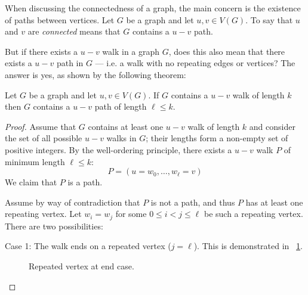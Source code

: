 When discussing the connectedness of a graph, the main concern is the existence of paths between vertices.  Let
\(G\) be a graph and let \(u,v\in V(G)\).  To say that \(u\) and \(v\) are \emph{connected} means that \(G\)
contains a \(u-v\) path.

But if there exists a \(u-v\) walk in a graph \(G\), does this also mean that there exists a \(u-v\) path in \(G\)
--- i.e. a walk with no repeating edges or vertices?  The answer is yes, as shown by the following theorem:

\begin{theorem}
  Let \(G\) be a graph and let \(u,v\in V(G)\).  If \(G\) contains a \(u-v\) walk of length \(k\) then \(G\)
  contains a \(u-v\) path of length \(\ell\le k\).
\end{theorem}

\begin{proof}
  Assume that \(G\) contains at least one \(u-v\) walk of length \(k\) and consider the set of all possible \(u-v\)
  walks in \(G\); their lengths form a non-empty set of positive integers.  By the well-ordering principle, there
  exists a \(u-v\) walk \(P\) of minimum length \(\ell\le k\):
  \[P=(u=w_0,\ldots,w_{\ell}=v)\]
  We claim that \(P\) is a path.

  Assume by way of contradiction that \(P\) is not a path, and thus \(P\) has at least one repeating vertex.  Let
  \(w_i=w_j\) for some \(0\le i<j\le\ell\) be such a repeating vertex.  There are two possibilities:
  
  \begin{description}
  \item Case 1: The walk ends on a repeated vertex (\(j=\ell\)).  This is demonstrated in
    \figurename~\ref{fig:rend}.

    \begin{figure}[H]
      \centering
      \caption{Repeated vertex at end case.}
      \label{fig:rend}
    \end{figure}


\end{description}
\end{proof}
